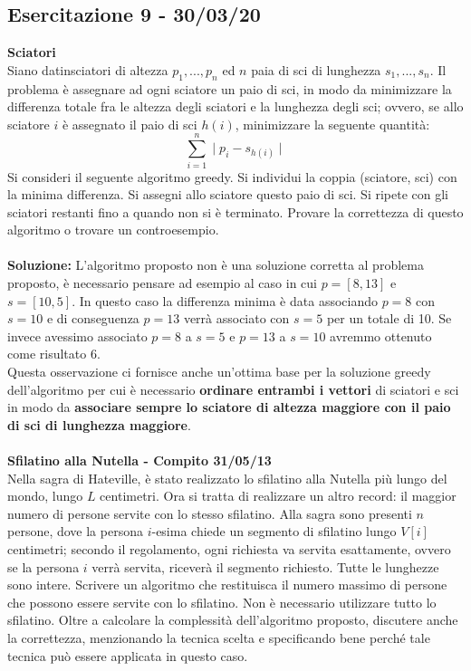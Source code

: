 \documentclass[../cheatSheetAlgoritmi.tex]{subfiles}
\begin{document}
\subsection{Esercitazione 9 - 30/03/20}
\textbf{Sciatori}\\
Siano datinsciatori di altezza $p_{1}, ..., p_{n}$ ed $n$ paia di sci di lunghezza $s_{1}, ..., s_{n}$. Il problema è assegnare ad ogni sciatore un paio di sci, in modo da minimizzare la differenza totale fra le altezza degli sciatori e la lunghezza degli sci; ovvero, se allo sciatore $i$ è assegnato il paio di sci $h(i)$, minimizzare la seguente quantità:\\
\begin{equation}
	\sum_{i = 1}^{n}\mid{p_{i} - s_{h(i)}}\mid
\end{equation}
Si consideri il seguente algoritmo greedy. Si individui la coppia (sciatore, sci) con la minima differenza. Si assegni allo sciatore questo paio di sci. Si ripete con gli sciatori restanti fino a quando non si è terminato. Provare la correttezza di questo algoritmo o trovare un controesempio.\\\\
\textbf{Soluzione:} L'algoritmo proposto non è una soluzione corretta al problema proposto, è necessario pensare ad esempio al caso in cui $p = [8, 13]$ e $s = [10, 5]$. In questo caso la differenza minima è data associando $p = 8$ con $s = 10$ e di conseguenza $p = 13$ verrà associato con $s = 5$ per un totale di 10. Se invece avessimo associato $p = 8$ a $s = 5$ e $p = 13$ a $s = 10$ avremmo ottenuto come risultato 6.\\
Questa osservazione ci fornisce anche un'ottima base per la soluzione greedy dell'algoritmo per cui è necessario \textbf{ordinare entrambi i vettori} di sciatori e sci in modo da \textbf{associare sempre lo sciatore di altezza maggiore con il paio di sci di lunghezza maggiore}.\\\\  
\textbf{Sfilatino alla Nutella - Compito 31/05/13}\\
Nella sagra di Hateville, è stato realizzato lo sfilatino alla Nutella più lungo del mondo, lungo $L$ centimetri. Ora si tratta di realizzare un altro record: il maggior numero di persone servite con lo stesso sfilatino. Alla sagra sono presenti $n$ persone, dove la persona $i$-esima chiede un segmento di sfilatino lungo $V[i]$ centimetri; secondo il regolamento, ogni richiesta va servita esattamente, ovvero se la persona $i$ verrà servita, riceverà il segmento richiesto. Tutte le lunghezze sono intere. Scrivere un algoritmo che restituisca il numero massimo di persone che possono essere servite con lo sfilatino. Non è necessario utilizzare tutto lo sfilatino. Oltre a calcolare la complessità dell’algoritmo proposto, discutere anche la correttezza, menzionando la tecnica scelta e specificando bene perché tale tecnica può essere applicata in questo caso.
\end{document}
